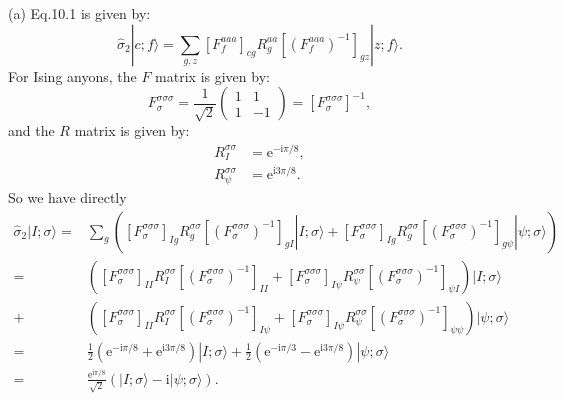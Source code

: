 (a) Eq.10.1 is given by:
\begin{equation*}
\hat{\sigma }_{2} |c;f\rangle =\sum _{g,z} [F_{f}^{aaa} ]_{cg} R_{g}^{aa} [(F_{f}^{aaa} )^{-1} ]_{gz} |z;f\rangle .
\end{equation*}
For Ising anyons, the $F$ matrix is given by:
\begin{equation*}
F_{\sigma }^{\sigma \sigma \sigma } =\frac{1}{\sqrt{2}}\begin{pmatrix}
1 & 1\\
1 & -1
\end{pmatrix} =[F_{\sigma }^{\sigma \sigma \sigma } ]^{-1} ,
\end{equation*}
and the $R$ matrix is given by:
\begin{equation*}
\begin{aligned}
R_{I}^{\sigma \sigma } & =\mathrm{e}^{-\mathrm{i} \pi /8} ,\\
R_{\psi }^{\sigma \sigma } & =\mathrm{e}^{\mathrm{i} 3\pi /8} .
\end{aligned}
\end{equation*}
So we have directly
\begin{equation*}
\begin{aligned}
\hat{\sigma }_{2} |I;\sigma \rangle = & \sum _{g} ([F_{\sigma }^{\sigma \sigma \sigma } ]_{Ig} R_{g}^{\sigma \sigma } [(F_{\sigma }^{\sigma \sigma \sigma } )^{-1} ]_{gI} |I;\sigma \rangle +[F_{\sigma }^{\sigma \sigma \sigma } ]_{Ig} R_{g}^{\sigma \sigma } [(F_{\sigma }^{\sigma \sigma \sigma } )^{-1} ]_{g\psi } |\psi ;\sigma \rangle )\\
= & ([F_{\sigma }^{\sigma \sigma \sigma } ]_{II} R_{I}^{\sigma \sigma } [(F_{\sigma }^{\sigma \sigma \sigma } )^{-1} ]_{II} +[F_{\sigma }^{\sigma \sigma \sigma } ]_{I\psi } R_{\psi }^{\sigma \sigma } [(F_{\sigma }^{\sigma \sigma \sigma } )^{-1} ]_{\psi I} )|I;\sigma \rangle \\
+ & ([F_{\sigma }^{\sigma \sigma \sigma } ]_{II} R_{I}^{\sigma \sigma } [(F_{\sigma }^{\sigma \sigma \sigma } )^{-1} ]_{I\psi } +[F_{\sigma }^{\sigma \sigma \sigma } ]_{I\psi } R_{\psi }^{\sigma \sigma } [(F_{\sigma }^{\sigma \sigma \sigma } )^{-1} ]_{\psi \psi } )|\psi ;\sigma \rangle \\
= & \frac{1}{2} (\mathrm{e}^{-\mathrm{i} \pi /8} +\mathrm{e}^{\mathrm{i} 3\pi /8} )|I;\sigma \rangle +\frac{1}{2} (\mathrm{e}^{-\mathrm{i} \pi /3} -\mathrm{e}^{\mathrm{i} 3\pi /8} )|\psi ;\sigma \rangle \\
= & \frac{\mathrm{e}^{\mathrm{i} \pi /8}}{\sqrt{2}} (|I;\sigma \rangle -\mathrm{i} |\psi ;\sigma \rangle ).
\end{aligned}
\end{equation*}
